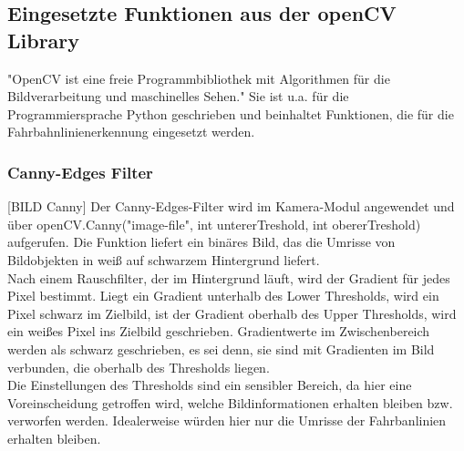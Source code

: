 \subsection{Eingesetzte Funktionen aus der openCV Library}
"OpenCV ist eine freie Programmbibliothek mit Algorithmen für die 
Bildverarbeitung und maschinelles Sehen." Sie ist u.a. für die
Programmiersprache Python geschrieben und beinhaltet Funktionen, die für die
Fahrbahnlinienerkennung eingesetzt werden.\\
\subsubsection{Canny-Edges Filter}
[BILD Canny]
Der Canny-Edges-Filter wird im Kamera-Modul angewendet und über
openCV.Canny("image-file", int untererTreshold, int obererTreshold)
aufgerufen. Die Funktion liefert ein binäres Bild, das die Umrisse
von Bildobjekten in weiß auf schwarzem Hintergrund liefert.\\
Nach einem Rauschfilter, der im Hintergrund läuft, wird der Gradient
für jedes Pixel bestimmt. Liegt ein Gradient unterhalb des Lower Thresholds,
wird ein Pixel schwarz im Zielbild, ist der Gradient oberhalb des Upper
Thresholds, wird ein weißes Pixel ins Zielbild geschrieben. Gradientwerte im
Zwischenbereich werden als schwarz geschrieben, es sei denn, sie sind mit
Gradienten im Bild verbunden, die oberhalb des Thresholds liegen.\\
Die Einstellungen des Thresholds sind ein sensibler Bereich, da hier eine
Voreinscheidung getroffen wird, welche Bildinformationen erhalten bleiben bzw.
verworfen werden. Idealerweise würden hier nur die Umrisse der Fahrbanlinien
erhalten bleiben.\\

